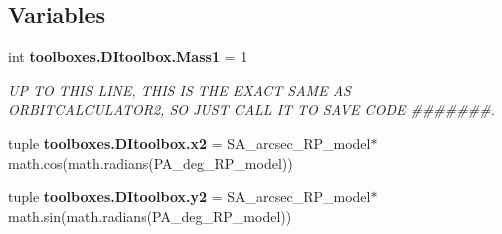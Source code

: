 \subsection*{Variables}
\begin{DoxyCompactItemize}
\item 
int {\bf toolboxes.\-D\-Itoolbox.\-Mass1} = 1
\begin{DoxyCompactList}\small\item\em U\-P T\-O T\-H\-I\-S L\-I\-N\-E, T\-H\-I\-S I\-S T\-H\-E E\-X\-A\-C\-T S\-A\-M\-E A\-S O\-R\-B\-I\-T\-C\-A\-L\-C\-U\-L\-A\-T\-O\-R2, S\-O J\-U\-S\-T C\-A\-L\-L I\-T T\-O S\-A\-V\-E C\-O\-D\-E \#\#\#\#\#\#\#. \end{DoxyCompactList}\item 
tuple {\bf toolboxes.\-D\-Itoolbox.\-x2} = S\-A\-\_\-arcsec\-\_\-\-R\-P\-\_\-model$\ast$math.\-cos(math.\-radians(P\-A\-\_\-deg\-\_\-\-R\-P\-\_\-model))
\item 
tuple {\bf toolboxes.\-D\-Itoolbox.\-y2} = S\-A\-\_\-arcsec\-\_\-\-R\-P\-\_\-model$\ast$math.\-sin(math.\-radians(P\-A\-\_\-deg\-\_\-\-R\-P\-\_\-model))
\end{DoxyCompactItemize}
